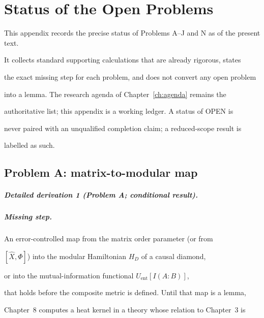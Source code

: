 \chapter{Status of the Open Problems}

\label{app:status}



This appendix records the precise status of Problems A--J and N as of the present text.

It collects standard supporting calculations that are already rigorous, states

the exact missing step for each problem, and does not convert any open problem

into a lemma. The research agenda of Chapter~\ref{ch:agenda} remains the

authoritative list; this appendix is a working ledger. A status of OPEN is

never paired with an unqualified completion claim; a reduced-scope result is

labelled as such.



\section{Problem A: matrix-to-modular map}

\label{sec:status-A}



\paragraph{Detailed derivation 1 (Problem A; conditional result).} \label{ref:detail-0} %



\paragraph{Missing step.}

An error-controlled map from the matrix order parameter (or from

\([\hat{X},\Phi]\)) into the modular Hamiltonian \(H_D\) of a causal diamond,

or into the mutual-information functional \(U_{\mathrm{ent}}[I(A:B)]\),

that holds before the composite metric is defined. Until that map is a lemma,

Chapter~8 computes a heat kernel in a theory whose relation to Chapter~3 is

